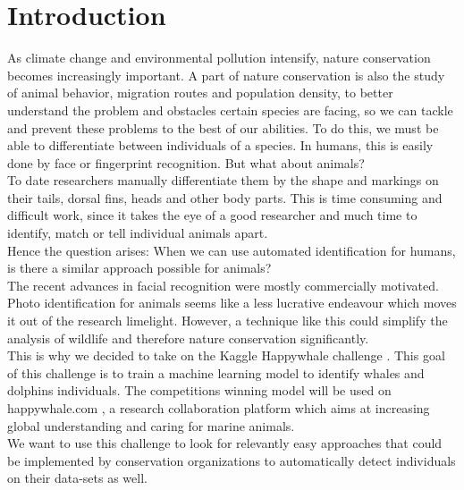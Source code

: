 \section{Introduction}
\label{sec:intro}

As climate change and environmental pollution intensify, nature conservation becomes increasingly important. A part of nature conservation is also the study of animal behavior, migration routes and population density, to better understand the problem and obstacles certain species are facing, so we can tackle and prevent these problems to the best of our abilities. To do this, we must be able to differentiate between individuals of a species. In humans, this is easily done by face or fingerprint recognition. But what about animals? \\
To date researchers manually differentiate them by the shape and markings on their tails, dorsal fins, heads and other body parts. This is time consuming and difficult work, since it takes the eye of a good researcher and much time to identify, match or tell individual animals apart. \\ Hence the question arises: When we can use automated identification for humans, is there a similar approach possible for animals? \\
The recent advances in facial recognition were mostly commercially motivated. Photo identification for animals seems like a less lucrative endeavour which moves it out of the research limelight. However, a technique like this could simplify the analysis of wildlife 
and therefore nature conservation significantly.\\
This is why we decided to take on the Kaggle Happywhale challenge \cite{kaggle}. This goal of this challenge is to train a machine learning model to identify whales and dolphins individuals. The competitions winning model will be used on happywhale.com \cite{happywhaledotcom}, a research collaboration platform which aims at increasing global understanding and caring for marine animals. \\ 
We want to use this challenge to look for relevantly easy approaches that could be implemented by conservation organizations to automatically detect individuals on their data-sets as well.
